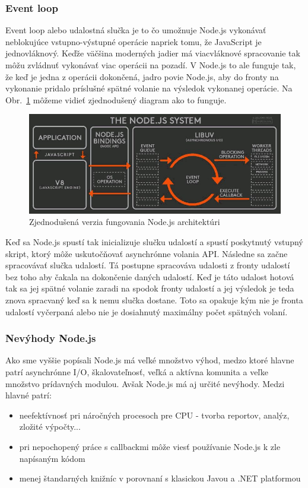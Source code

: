 \subsubsection{Event loop}
\indent Event loop alebo udalostná slučka je to čo umožnuje Node.js vykonávať neblokujúce vstupno-výstupné operácie napriek tomu, že JavaScript je jednovláknový. Keďže väčšina moderných jadier má viacvláknové spracovanie tak môžu zvládnuť vykonávať viac operácii na pozadí. V Node.js to ale funguje tak, že keď je jedna z operácii dokončená, jadro povie Node.js, aby do fronty na vykonanie pridalo príslušné spätné volanie na výsledok vykonanej operácie. Na Obr.~\ref{fig:event_loop} môžeme vidieť zjednodušený diagram ako to funguje. 

\begin{figure}[H]
    \centering
    \includegraphics[scale=0.55]{img/evet_loop.jpg}
    \caption{Zjednodušená verzia fungovania Node.js architektúri}
    \label{fig:event_loop}
\end{figure}

\indent Keď sa Node.js spustí tak inicializuje slučku udalostí a spustí poskytnutý vstupný skript, ktorý môže uskutočňovať asynchrónne volania API. Následne sa začne spracovávať slučka udalostí. Tá postupne spracováva udalosti z fronty udalostí bez toho aby čakala na dokončenie daných udalostí. Keď je táto udalost hotová tak sa jej spätné volanie zaradi na spodok fronty udalostí a jej výsledok je teda znova spracvaný keď sa k nemu slučka dostane. Toto sa opakuje kým nie je fronta udalostí vyčerpaná alebo nie je dosiahnutý maximálny počet spätných volaní. 

\subsubsection{Nevýhody Node.js}
\indent Ako sme vyššie popísali Node.js má veľké množstvo výhod, medzo ktoré hlavne patrí asynchrónne I/O, škalovateľnosť, veľká a aktívna komunita a veľke množstvo prídavných modulou. Avšak Node.js má aj určité nevýhody. Medzi hlavné patrí:
\begin{itemize}
    \item neefektívnosť pri náročných procesoch pre CPU - tvorba reportov, analýz, zložité výpočty... 
    \item pri nepochopený práce s callbackmi môže viesť používanie Node.js k zle napísaným kódom
    \item menej štandarných knižníc v porovnaní s klasickou Javou a .NET platformou
\end{itemize}

